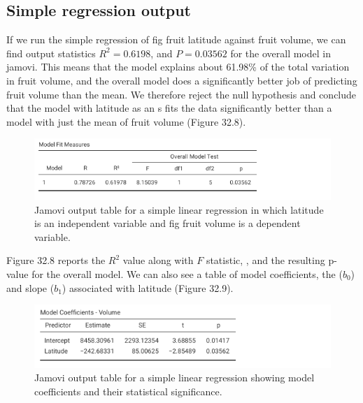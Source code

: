 \documentclass[
  openany]{krantz}
\begin{document}
\hypertarget{simple-regression-output}{%
\subsection{Simple regression output}\label{simple-regression-output}}

If we run the simple regression of fig fruit latitude against fruit volume, we can find output statistics \(R^{2} = 0.6198\), and \(P = 0.03562\) for the overall model in jamovi.
This means that the model explains about 61.98\% of the total variation in fruit volume, and the overall model does a significantly better job of predicting fruit volume than the mean.
We therefore reject the null hypothesis and conclude that the model with latitude as an s fits the data significantly better than a model with just the mean of fruit volume (Figure 32.8).

\begin{figure}
\includegraphics[width=1\linewidth]{img/jamovi_overall_regression_output} \caption{Jamovi output table for a simple linear regression in which latitude is an independent variable and fig fruit volume is a dependent variable.}\label{fig:unnamed-chunk-148}
\end{figure}

Figure 32.8 reports the \(R^{2}\) value along with \(F\) statistic, , and the resulting p-value for the overall model.
We can also see a table of model coefficients, the  (\(b_{0}\)) and slope (\(b_{1}\)) associated with latitude (Figure 32.9).

\begin{figure}
\includegraphics[width=1\linewidth]{img/jamovi_overall_regression_coefficients} \caption{Jamovi output table for a simple linear regression showing model coefficients and their statistical significance.}\label{fig:unnamed-chunk-149}
\end{figure}
\end{document}
